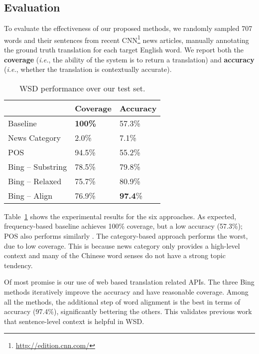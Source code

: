 \begin{CJK}{UTF8}{gbsn}
\subsection{Evaluation}
To evaluate the effectiveness of our proposed methods, we randomly
sampled 707 words and their sentences from recent
CNN\footnote{\url{http://edition.cnn.com/}} news articles, manually
annotating the ground truth translation for each target English
word. We report both the {\bf coverage} ({\it i.e.}, the ability of
the system is to return a translation) and {\bf accuracy} ({\it i.e.},
whether the translation is contextually accurate).

\begin{table}[t]
\centering
  \caption{WSD performance over our test set.}
  \label{table:evaluation_1}
  \begin{tabular}{| p{2.7cm} | p{1.7cm} | p{1.7cm} |}
    \hline
     & {\bf Coverage} & {\bf Accuracy}\\
    \hline
    Baseline & {\bf 100\%} & 57.3\%\\
    \hline
    News Category & 2.0\% & 7.1\%\\
    \hline
    POS & 94.5\% & 55.2\%\\
    \hline
    Bing -- Substring & 78.5\% & 79.8\%\\
    \hline
    Bing -- Relaxed  & 75.7\% & 80.9\%\\
    \hline
    Bing -- Align & 76.9\% & {\bf 97.4}\%\\
    \hline
  \end{tabular}
\end{table}

Table~\ref{table:evaluation_1} shows the experimental results for the
six approaches.  As expected, frequency-based baseline achieves 100\%
coverage, but a low accuracy (57.3\%); POS also performs similarly
. The category-based approach performs the worst, due to low coverage.
This is because news category only provides a high-level context and
many of the Chinese word senses do not have a strong topic tendency.

Of most promise is our use of web based translation related APIs.  The
three Bing methods iteratively improve the accuracy and have
reasonable coverage. Among all the methods, the additional step of
word alignment is the best in terms of accuracy (97.4\%),
significantly bettering the others. This validates previous work that
sentence-level context is helpful in WSD.



\end{CJK}
